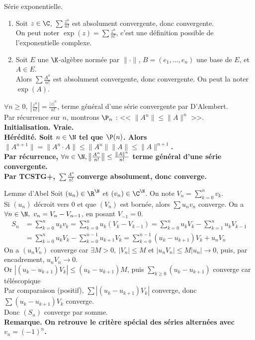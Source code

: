 \documentclass[11pt]{article}
\begin{document}
\begin{prop}{Série exponentielle.}{}
    \begin{enumerate}
        \item Soit $z\in\C$, $\sum\frac{z^n}{n!}$ est absolument convergente, donc convergente.\\
        On peut noter $\exp(z)=\sum\frac{z^n}{n!}$, c'est une définition possible de l'exponentielle complexe.
        \item Soit $E$ une $\K$-algèbre normée par $\|\cdot\|$, $B=(e_1,...,e_n)$ une base de $E$, et $A\in E$.\\
            Alors $\sum\frac{A^n}{n!}$ est absolument convergente, donc convergente. On peut la noter $\exp(A)$.
    \end{enumerate}
    \tcblower
     $\forall n \geq 0, ~ \left|\frac{z^n}{n!}\right| = \frac{|z|^n}{n!}$, terme général d'une série convergente par D'Alembert.\\
     Par récurrence sur $n$, montrons $\P_n$ : << $\|A^n\|\leq\|A\|^n$ >>.\\
    \bf{Initialisation.} Vraie.\\
    \bf{Hérédité.} Soit $n\in\N$ tel que $\P(n)$. Alors $\|A^{n+1}\|=\|A^n\cdot A\|\leq\|A^n\|\|A\|\leq \|A\|^{n+1}$.\\
    Par récurrence, $\forall n \in \N, \left\|\frac{A^n}{n!}\right\| \leq \frac{\|A\|^n}{n!}$ terme général d'une série convergente.\\
    Par TCSTG+, $\sum\frac{A^n}{n!}$ converge absolument, donc converge.
\end{prop}

\begin{exi}{Lemme d'Abel}{}
    Soit $(u_n)\in\R^\N$ et $(v_n)\in\C^\N$. On note $V_n = \sum_{k=0}^n v_k$.\\
    Si $(u_n)$ décroit vers 0 et que $(V_n)$ est bornée, alors $\sum u_n v_n$ converge.
    \tcblower
    On a $\forall n \in \N, ~ v_n = V_n - V_{n-1}$, en posant $V_{-1}=0$.
    \begin{align*}
        S_n &= \sum_{k=0}^nu_kv_k=\sum_{k=0}^nu_k(V_k - V_{k-1})
             =\sum_{k=0}^nu_kV_k-\sum_{k=1}^nu_kV_{k-1}\\
            &=\sum_{k=0}^nu_kV_k - \sum_{k=0}^{n-1}u_{k+1}V_k = \sum_{k=0}^{n-1}(u_k-u_{k+1})V_k + u_nV_n
    \end{align*}
    On a $(u_nV_n)$ converge car $\exists M > 0, ~ |V_n|\leq M$ et $|u_nV_n|\leq M|u_n|\to 0$, puis, par encadrement, $u_nV_n\to0$.\\
    Or $|(u_k-u_{k+1})V_k|\leq(u_k-u_{k+1})M$, puis $\sum_{k\geq0}(u_k-u_{k+1})$ converge car téléscopique\\
    Par comparaison (positif), $\sum |(u_k-u_{k+1})V_k|$ converge, donc $\sum(u_k-u_{k+1})V_k$ converge.\\
    Donc $(S_n)$ converge par somme.\\
    \bf{Remarque.} On retrouve le critère spécial des séries alternées avec $v_n=(-1)^n$.
\end{exi}
\end{document}
